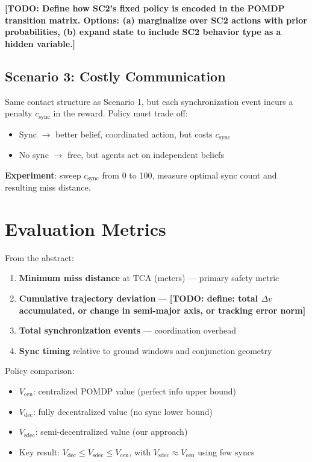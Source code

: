 \documentclass[11pt]{article}
\newcommand{\TODO}[1]{\textcolor{todo}{\textbf{[TODO: #1]}}}
\begin{document}
\TODO{Define how SC2's fixed policy is encoded in the POMDP transition matrix.
Options: (a) marginalize over SC2 actions with prior probabilities, (b) expand
state to include SC2 behavior type as a hidden variable.}

\subsection{Scenario 3: Costly Communication}

Same contact structure as Scenario 1, but each synchronization event incurs
a penalty $c_\text{sync}$ in the reward. Policy must trade off:
\begin{itemize}
  \item Sync $\rightarrow$ better belief, coordinated action, but costs $c_\text{sync}$
  \item No sync $\rightarrow$ free, but agents act on independent beliefs
\end{itemize}

\textbf{Experiment}: sweep $c_\text{sync}$ from 0 to 100, measure optimal
sync count and resulting miss distance.

\section{Evaluation Metrics}

From the abstract:
\begin{enumerate}
  \item \textbf{Minimum miss distance} at TCA (meters) --- primary safety metric
  \item \textbf{Cumulative trajectory deviation} --- \TODO{define: total $\Delta v$
        accumulated, or change in semi-major axis, or tracking error norm}
  \item \textbf{Total synchronization events} --- coordination overhead
  \item \textbf{Sync timing} relative to ground windows and conjunction geometry
\end{enumerate}

Policy comparison:
\begin{itemize}
  \item $V_\text{cen}$: centralized POMDP value (perfect info upper bound)
  \item $V_\text{dec}$: fully decentralized value (no sync lower bound)
  \item $V_\text{sdec}$: semi-decentralized value (our approach)
  \item Key result: $V_\text{dec} \leq V_\text{sdec} \leq V_\text{cen}$,
        with $V_\text{sdec} \approx V_\text{cen}$ using few syncs
\end{itemize}
\end{document}
